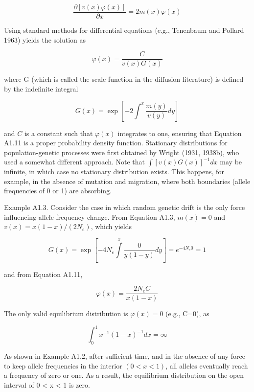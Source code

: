 \documentclass{article}
\begin{document}
\begin{equation}
\frac{\partial[v(x)\varphi(x)]}{\partial x}=2m(x)\varphi(x)
\end{equation}

Using standard methods for differential equations (e.g., Tenenbaum and Pollard 1963) yields the solution as

\begin{equation}
\varphi(x)=\frac{C}{v(x)G(x)}
\end{equation}

where G (which is called the scale function in the diffusion literature) is defined by the indefinite integral

\begin{equation}
G(x)=\exp\left[-2\int^{x}\frac{m(y)}{v(y)}dy\right]
\end{equation}

and $C$ is a constant such that $\varphi(x)$ integrates to one, ensuring that Equation A1.11 is a proper probability density function. Stationary distributions for population-genetic processes were first obtained by Wright (1931, 1938b), who used a somewhat different approach. Note that $\int [v(x) G(x)]^{-1} dx$ may be infinite, in which case no stationary distribution exists. This happens, for example, in the absence of mutation and migration, where both boundaries (allele frequencies of 0 or 1) are absorbing.

Example A1.3. Consider the case in which random genetic drift is the only force influencing allele-frequency change. From Equation A1.3,  $ m(x) = 0 $ and  $ v(x) = x(1 - x)/(2N_e) $, which yields

\begin{equation}
G(x)=\exp\left[-4N_{e}\int\limits_{}^{x}\frac{0}{y(1-y)}dy\right]=e^{-4N_{e}0}=1
\end{equation}

and from Equation A1.11,

\begin{equation}
\varphi(x)=\frac{2N_{e}C}{x(1-x)}
\end{equation}

The only valid equilibrium distribution is  $ \varphi(x)=0 $ (e.g., C=0), as

\begin{equation}
\int_{0}^{1}x^{-1}(1-x)^{-1}dx=\infty
\end{equation}

As shown in Example A1.2, after sufficient time, and in the absence of any force to keep allele frequencies in the interior  $ (0 < x < 1) $, all alleles eventually reach a frequency of zero or one. As a result, the equilibrium distribution on the open interval of 0 < x < 1 is zero.
\end{document}
